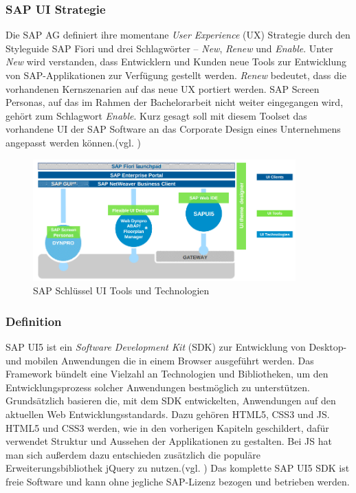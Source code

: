 \subsubsection{SAP UI Strategie}
Die SAP AG definiert ihre momentane \textit{User Experience} (UX) Strategie durch den Styleguide SAP Fiori und drei Schlagwörter -- \textit{New}, \textit{Renew} und \textit{Enable}. Unter \textit{New} wird verstanden, dass Entwicklern und Kunden neue Tools zur Entwicklung von SAP-Applikationen zur Verfügung gestellt werden. \textit{Renew} bedeutet, dass die vorhandenen Kernszenarien auf das neue UX portiert werden. SAP Screen Personas, auf das im Rahmen der Bachelorarbeit nicht weiter eingegangen wird, gehört zum Schlagwort \textit{Enable}. Kurz gesagt soll mit diesem Toolset das vorhandene UI der SAP Software an das Corporate Design eines Unternehmens angepasst werden können.(vgl. \cite{SAPUX})

\vspace{1em}
\begin{figure}[htb]
  \centering
  \includegraphics[width=0.9\textwidth]{abb/sap_key_ui_tools}
  \caption[SAP Schlüssel UI Tools und Technologien]{SAP Schlüssel UI Tools und Technologien \cite{SAPUXPDF}}
  \label{fig:sapkeyuitools}
\end{figure}

\subsubsection{Definition}
SAP UI5 ist ein \textit{Software Development Kit} (SDK) zur Entwicklung von Desktop- und mobilen Anwendungen die in einem Browser ausgeführt werden. Das Framework bündelt eine Vielzahl an Technologien und Bibliotheken, um den Entwicklungsprozess solcher Anwendungen bestmöglich zu unterstützen. Grundsätzlich basieren die, mit dem SDK entwickelten, Anwendungen auf den aktuellen Web Entwicklungsstandards. Dazu gehören HTML5, CSS3 und JS. HTML5 und CSS3 werden, wie in den vorherigen Kapiteln geschildert, dafür verwendet Struktur und Aussehen der Applikationen zu gestalten. Bei JS hat man sich außerdem dazu entschieden zusätzlich die populäre Erweiterungsbibliothek jQuery zu nutzen.(vgl. \cite{BuiltWith2014}) Das komplette SAP UI5 SDK ist freie Software und kann ohne jegliche SAP-Lizenz bezogen und betrieben werden.

